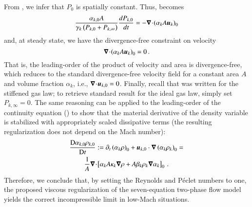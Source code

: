 \documentclass[preprint,10pt]{elsarticle}
\begin{document}
%
From , we infer that $P_0$ is spatially constant. Thus,  becomes
%
\begin{equation}\label{eq:div_free_energy}
\frac{\alpha_{k,0}  A}{\gamma_k\left( P_{k,0} + P_{k,\infty} \right)} \frac{d P_{k,0}}{dt} = - \boldsymbol\nabla\! \cdot \! \left( \alpha_k A \boldsymbol u_k \right)_0 
\end{equation}
%
and, at steady state, we have the divergence-free constraint on velocity
%
\begin{equation}
\boldsymbol\nabla\! \cdot \! \left( \alpha_k A \boldsymbol u_k \right)_0  = 0 \, .
\end{equation}
%
That is, the leading-order of the product of velocity and area is divergence-free, which reduces to the standard divergence-free velocity field for a constant area $A$ and volume fraction $\alpha_k$, i.e., $\boldsymbol\nabla\! \cdot \! \boldsymbol u_{k,0}=0$. Finally, recall that  was written for the stiffened gas law; to retrieve standard result for the ideal gas law, simply set $P_{k,\infty}=0$. 
%
The same reasoning can be applied to the leading-order 
of the continuity equation () to show that the material derivative of the density variable is stabilized with appropriately scaled dissipative terms (the resulting regularization does not depend on the Mach number):
\begin{multline}
\frac{\textrm{D} \alpha_{k,0} \rho_{k,0}}{\textrm{D} t} := \partial_t \left( \alpha_k \rho\right)_0 + \boldsymbol u_{k,0} \cdot \boldsymbol\nabla \left( \alpha_k \rho_k \right)_0 =\\
\frac{1}{A}  \boldsymbol\nabla\! \cdot \! \left[ \alpha_k A \kappa_k \boldsymbol\nabla \rho + A \beta_k \rho_k \boldsymbol\nabla \alpha_k \right]_0 \, .
\end{multline}
%
Therefore, we conclude that, by setting the Reynolds and P\'eclet numbers to one, the proposed viscous regularization
of the seven-equation two-phase flow model yields the correct incompressible limit in low-Mach situations.

\end{document}
